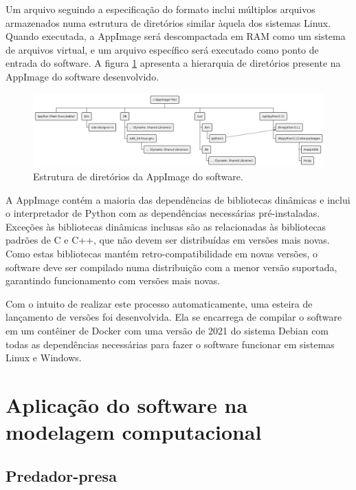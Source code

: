 \documentclass[
	12pt,				%
	openright,			%
	oneside,			%
	a4paper,			%
	main=brazil,
	english,			%
	]{ufsj-abntex2}
\begin{document}
Um arquivo seguindo a especificação do formato inclui múltiplos arquivos armazenados numa estrutura de diretórios similar àquela dos sistemas Linux. Quando executada, a AppImage será descompactada em RAM como um sistema de arquivos virtual, e um arquivo específico será executado como ponto de entrada do software. A figura \ref{fig:appimage} apresenta a hierarquia de diretórios presente na AppImage do software desenvolvido.

\begin{figure}[h]
    \centering
    \includegraphics[scale=0.37]{diagrams/img/appimage.png} 
    \caption{Estrutura de diretórios da AppImage do software.}
    \label{fig:appimage}
\end{figure}

A AppImage contém a maioria das dependências de bibliotecas dinâmicas e inclui o interpretador de Python com as dependências necessárias pré-instaladas. Exceções às bibliotecas dinâmicas inclusas são as relacionadas às bibliotecas padrões de C e C++, que não devem ser 
distribuídas em versões mais novas. Como estas bibliotecas mantém retro-compatibilidade em novas versões, o software deve ser compilado numa distribuição com a menor versão suportada, garantindo funcionamento com versões mais novas.

Com o intuito de realizar este processo automaticamente, uma esteira de lançamento de versões foi desenvolvida. Ela se encarrega de compilar o software em um contêiner de Docker \cite{merkel2014docker} com uma versão de 2021 do sistema Debian com todas as dependências necessárias para fazer o software funcionar em sistemas Linux e Windows. 

\chapter{Aplicação do software na modelagem computacional}
\label{chap:resultados}

\section{Predador-presa}
\end{document}
